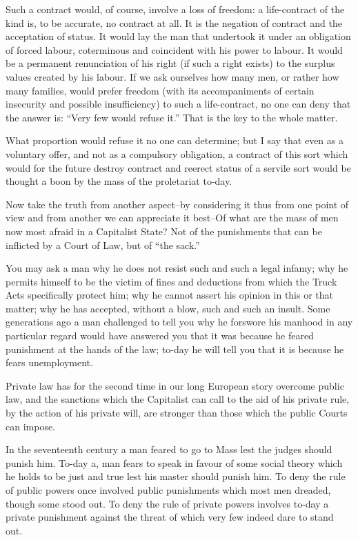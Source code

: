 \documentclass{book}
\begin{document}
Such a contract would, of course, involve a loss of freedom: a life-contract of the kind is, to be accurate, no contract at all. It is the negation of contract and the acceptation of status. It would lay the man that undertook it under an obligation of forced labour, coterminous and coincident with his power to labour. It would be a permanent renunciation of his right (if such a right exists) to the surplus values created by his labour. If we ask ourselves how many men, or rather how many families, would prefer freedom (with its accompaniments of certain insecurity and possible insufficiency) to such a life-contract, no one can deny that the answer is: “Very few would refuse it.” That is the key to the whole matter.

What proportion would refuse it no one can determine; but I say that even as a voluntary offer, and not as a compulsory obligation, a contract of this sort which would for the future destroy contract and reerect status of a servile sort would be thought a boon by the mass of the proletariat to-day.

Now take the truth from another aspect–by considering it thus from one point of view and from another we can appreciate it best–Of what are the mass of men now most afraid in a Capitalist State? Not of the punishments that can be inflicted by a Court of Law, but of “the sack.”

You may ask a man why he does not resist such and such a legal infamy; why he permits himself to be the victim of fines and deductions from which the Truck Acts specifically protect him; why he cannot assert his opinion in this or that matter; why he has accepted, without a blow, such and such an insult. Some generations ago a man challenged to tell you why he forswore his manhood in any particular regard would have answered you that it was because he feared punishment at the hands of the law; to-day he will tell you that it is because he fears unemployment.

Private law has for the second time in our long European story overcome public law, and the sanctions which the Capitalist can call to the aid of his private rule, by the action of his private will, are stronger than those which the public Courts can impose.

In the seventeenth century a man feared to go to Mass lest the judges should punish him. To-day a, man fears to speak in favour of some social theory which he holds to be just and true lest his master should punish him. To deny the rule of public powers once involved public punishments which most men dreaded, though some stood out. To deny the rule of private powers involves to-day a private punishment against the threat of which very few indeed dare to stand out.
\end{document}
